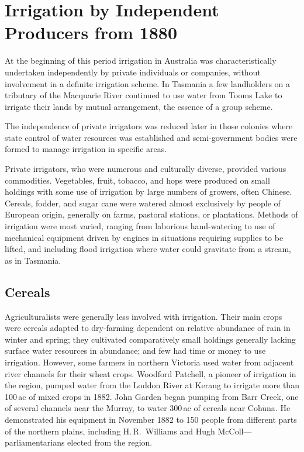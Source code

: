 
\setcounter{endnote}{0}
 
\chapter{Irrigation by Independent Producers from 1880}
\label{ch:indep}

At the beginning of this period irrigation in Australia was
characteristically undertaken independently by private individuals or
companies, without involvement in a definite irrigation scheme.  In
Tasmania a few landholders on a tributary of the Macquarie River
continued to use water from Tooms Lake to irrigate their lands by
mutual arrangement, the essence of a group scheme.

The independence of private irrigators was reduced later in those
colonies where state control of water resources was established and
semi-government bodies were formed to manage irrigation in specific
areas.

Private irrigators, who were numerous and culturally diverse, provided
various commodities.  Vegetables, fruit, tobacco, and hops were
produced on small holdings with some use of irrigation by large
numbers of growers, often Chinese.  Cereals, fodder, and sugar cane
were watered almost exclusively by people of European origin,
generally on farms, pastoral stations, or plantations.  Methods of
irrigation were most varied, ranging from laborious hand-watering to
use of mechanical equipment driven by engines in situations requiring
supplies to be lifted, and including flood irrigation where water
could gravitate from a stream, as in Tasmania.

\section*{Cereals}

Agriculturalists were generally less involved with irrigation. Their
main crops were cereals adapted to dry-farming dependent on relative
abundance of rain in winter and spring; they cultivated comparatively
small holdings generally lacking surface water resources in abundance;
and few had time or money to use irrigation.  However, some farmers in
northern Victoria used water from adjacent river channels for their
wheat crops.  Woodford Patchell, a pioneer of irrigation in the
region, pumped water from the Loddon River at Kerang to irrigate more
than 100\,ac of mixed crops in 1882. John Garden began pumping from
Barr Creek, one of several channels near the Murray, to water 300\,ac
of cereals near Cohuna.  He demonstrated his equipment in November
1882 to 150 people from different parts of the northern plains,
including H.\,R.~Williams and Hugh McColl---parliamentarians elected
from the region.


